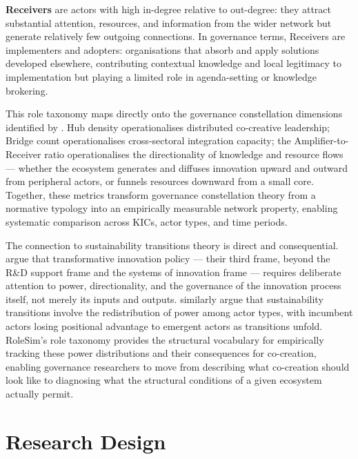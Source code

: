 \documentclass[review,12pt]{elsarticle}
\begin{document}
\textbf{Receivers} are actors with high in-degree relative to out-degree: they attract substantial attention, resources, and information from the wider network but generate relatively few outgoing connections. In governance terms, Receivers are implementers and adopters: organisations that absorb and apply solutions developed elsewhere, contributing contextual knowledge and local legitimacy to implementation but playing a limited role in agenda-setting or knowledge brokering.

This role taxonomy maps directly onto the governance constellation dimensions identified by \citet{ansell2021co}. Hub density operationalises distributed co-creative leadership; Bridge count operationalises cross-sectoral integration capacity; the Amplifier-to-Receiver ratio operationalises the directionality of knowledge and resource flows --- whether the ecosystem generates and diffuses innovation upward and outward from peripheral actors, or funnels resources downward from a small core. Together, these metrics transform governance constellation theory from a normative typology into an empirically measurable network property, enabling systematic comparison across KICs, actor types, and time periods.

The connection to sustainability transitions theory is direct and consequential. \citet{schot2018three} argue that transformative innovation policy --- their third frame, beyond the R\&D support frame and the systems of innovation frame --- requires deliberate attention to power, directionality, and the governance of the innovation process itself, not merely its inputs and outputs. \citet{avelino2016shifting} similarly argue that sustainability transitions involve the redistribution of power among actor types, with incumbent actors losing positional advantage to emergent actors as transitions unfold. RoleSim's role taxonomy provides the structural vocabulary for empirically tracking these power distributions and their consequences for co-creation, enabling governance researchers to move from describing what co-creation should look like to diagnosing what the structural conditions of a given ecosystem actually permit.

\section{Research Design}
\label{sec:design}
\end{document}
